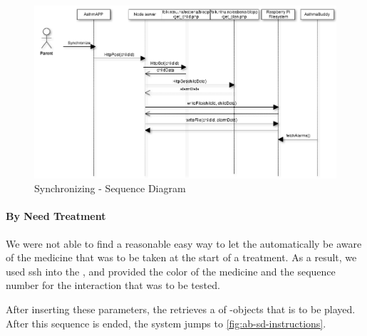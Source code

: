 \begin{figure}
	\centering
		\includegraphics[scale=0.6]{Pictures/sd/sd-synchronizing.png}
	\caption{Synchronizing - Sequence Diagram}
	\label{fig:ab-sd-synchronizing}
\end{figure}

\paragraph{By Need Treatment}
We were not able to find a reasonable easy way to let the \buddy{} automatically be aware of the medicine that was to be taken at the start of a treatment. As a result, we used ssh into the \rpi{}, and provided the color of the medicine and the sequence number for the interaction that was to be tested.

After inserting these parameters, the  retrieves a  of -objects that is to be played. After this sequence is ended, the system jumps to \ref{fig:ab-sd-instructions}.
 
